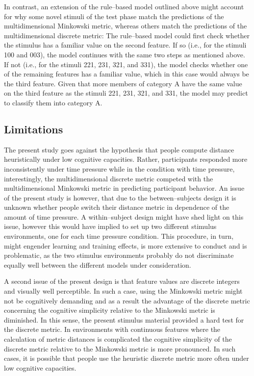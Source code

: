 \documentclass[a4paper,man,natbib]{apa6}
\begin{document}
In contrast, an extension of the rule--based model outlined above might account for why some novel stimuli of the test phase match the predictions of the multidimensional Minkowski metric, whereas others match the predictions of the multidimensional discrete metric: The rule--based model could first check whether the stimulus has a familiar value on the second feature. If so (i.e., for the stimuli 100 and 003), the model continues with the same two steps as mentioned above. If not (i.e., for the stimuli 221, 231, 321, and 331), the model checks whether one of the remaining features has a familiar value, which in this case would always be the third feature. Given that more members of category A have the same value on the third feature as the stimuli 221, 231, 321, and 331, the model may predict to classify them into category A. 

\subsection{Limitations}
The present study goes against the hypothesis that people compute distance heuristically under low cognitive capacities. Rather, participants responded more inconsistently under time pressure while in the condition with time pressure, interestingly, the multidimensional discrete metric competed with the multidimensional Minkowski metric in predicting participant behavior. An issue of the present study is however, that due to the between--subjects design it is unknown whether people switch their distance metric in dependence of the amount of time pressure. A within--subject design might have shed light on this issue, however this would have implied to set up two different stimulus environments, one for each time pressure condition. This procedure, in turn, might engender learning and training effects, is more extensive to conduct and is problematic, as the two stimulus environments probably do not discriminate equally well between the different models under consideration.

A second issue of the present design is that feature values are discrete integers and visually well perceptible. In such a case, using the Minkowski metric might not be cognitively demanding and as a result the advantage of the discrete metric concerning the cognitive simplicity relative to the Minkowski metric is diminished. In this sense, the present stimulus material provided a hard test for the discrete metric. In environments with continuous features where the calculation of metric distances is complicated the cognitive simplicity of the discrete metric relative to the Minkowski metric is more pronounced. In such cases, it is possible that people use the heuristic discrete metric more often under low cognitive capacities.
\end{document}
